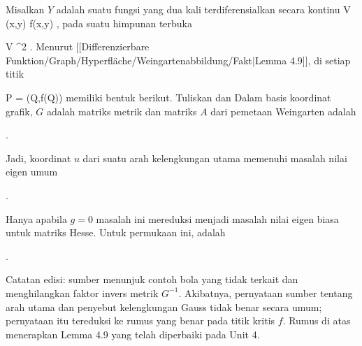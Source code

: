 {

Misalkan $Y$ adalah
suatu fungsi yang dua kali terdiferensialkan secara kontinu
 { V } { \R
} {(x,y)} { f(x,y)
} {,}
pada suatu himpunan terbuka

\mavergleichskette
{\vergleichskette
{ V
}
{ \subseteq }{ \R^2
}
{  }{
}
{    }{
}
{   }{
}
}
{}{}{.}
Menurut
[[Differenzierbare Funktion/Graph/Hyperfläche/Weingartenabbildung/Fakt|Lemma 4.9]],
 {} {}
di setiap titik

\mavergleichskette
{\vergleichskette
{ P
}
{ = }{ (Q,f(Q))
}
{  }{
}
{    }{
}
{   }{
}
}
{}{}{}
memiliki bentuk berikut. Tuliskan
dan
Dalam basis koordinat grafik, $G$ adalah matriks metrik dan matriks $A$ dari pemetaan Weingarten adalah

 { . }

Jadi, koordinat $u$ dari suatu arah kelengkungan utama memenuhi masalah nilai eigen umum

 { . }

Hanya apabila $g=0$ masalah ini mereduksi menjadi masalah nilai eigen biasa untuk matriks Hesse. Untuk permukaan ini,
adalah

 { . }

Catatan edisi: sumber menunjuk contoh bola yang tidak terkait dan menghilangkan faktor invers metrik $G^{-1}$. Akibatnya, pernyataan sumber tentang arah utama dan penyebut kelengkungan Gauss tidak benar secara umum; pernyataan itu tereduksi ke rumus yang benar pada titik kritis $f$. Rumus di atas menerapkan Lemma 4.9 yang telah diperbaiki pada Unit 4.

}

